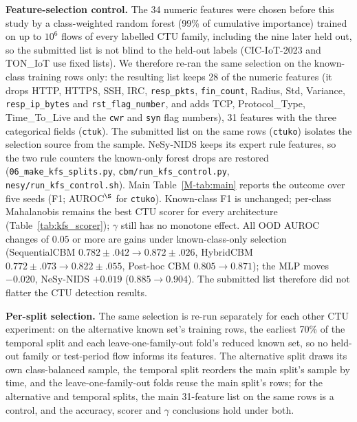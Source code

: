 \documentclass[journal]{IEEEtran}
\begin{document}
\begin{sloppypar}\textbf{Feature-selection control.} The 34 numeric features were chosen before this study by a
class-weighted random forest (99\% of cumulative importance) trained on up to $10^6$ flows of every
labelled CTU family, including the nine later held out, so the submitted list is not blind to the
held-out labels (CIC-IoT-2023 and TON\_IoT use fixed lists). We therefore re-ran the same selection
on the known-class training rows only: the resulting list keeps 28 of the numeric features (it
drops HTTP, HTTPS, SSH, IRC, \texttt{resp\_pkts}, \texttt{fin\_count}, Radius, Std, Variance,
\texttt{resp\_ip\_bytes} and \texttt{rst\_flag\_number}, and adds TCP, Protocol\_Type, Time\_To\_Live
and the \texttt{cwr} and \texttt{syn} flag numbers), 31 features with the three categorical fields
(\texttt{ctuk}). The submitted list on the same rows (\texttt{ctuko}) isolates the selection source
from the sample. NeSy-NIDS keeps its expert rule features, so the two rule counters the known-only
forest drops are restored (\texttt{06\_make\_kfs\_splits.py}, \texttt{cbm/run\_kfs\_control.py},
\texttt{nesy/run\_kfs\_control.sh}). Main Table~\ref{M-tab:main} reports the outcome over five seeds
(F1; AUROC$^\S$ for \texttt{ctuko}). Known-class F1 is unchanged; per-class Mahalanobis remains the best
CTU scorer for every architecture (Table~\ref{tab:kfs_scorer}); $\gamma$ still has no monotone
effect. All OOD AUROC changes of $0.05$ or more are gains under known-class-only selection
(SequentialCBM $0.782{\pm}.042{\to}0.872{\pm}.026$, HybridCBM $0.772{\pm}.073{\to}0.822{\pm}.055$,
Post-hoc CBM $0.805{\to}0.871$); the MLP moves $-0.020$, NeSy-NIDS $+0.019$ ($0.885{\to}0.904$). The
submitted list therefore did not flatter the CTU detection results.\end{sloppypar}

\textbf{Per-split selection.} The same selection is re-run separately for each other CTU
experiment: on the alternative known set's training rows, the earliest 70\% of the temporal split
and each leave-one-family-out fold's reduced known set, so no held-out family or test-period flow
informs its features. The alternative split draws its own class-balanced sample, the temporal split
reorders the main split's sample by time, and the leave-one-family-out folds reuse the main split's
rows; for the alternative and temporal splits, the main 31-feature list on the same rows is a
control, and the accuracy, scorer and $\gamma$ conclusions hold under both.
\end{document}
